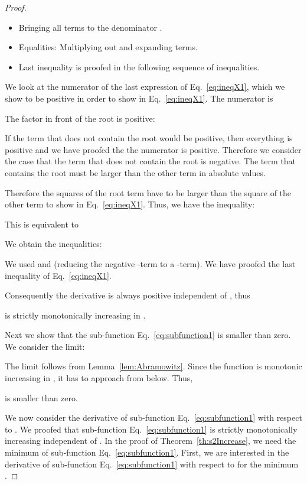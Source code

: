 \documentclass{article}
\begin{document}
\begin{proof}
\begin{itemize}
\item Bringing all terms to the denominator
.

\item Equalities: Multiplying out and expanding terms.

\item Last inequality  is proofed in the following sequence of
  inequalities.
\end{itemize}

We look at the numerator of the last expression of 
Eq.~\eqref{eq:ineqX1}, which we show to be
positive in order to show  in 
Eq.~\eqref{eq:ineqX1}. The numerator is 

The factor 
in front of the root is positive:

If the term that does not contain the root would be positive, 
then everything is positive and we have proofed the the numerator is
positive. Therefore we consider the case that the term that does
not contain the root is negative.
The term that contains the root must be larger than 
the other term in absolute values. 

Therefore the squares of the root term have to be larger 
than the square of the other term to show  in 
Eq.~\eqref{eq:ineqX1}.
Thus, we have the inequality:


This is equivalent to

We obtain the inequalities: 

We used  and  (reducing the negative -term to a
-term).
We have proofed the last inequality  of Eq.~\eqref{eq:ineqX1}.

Consequently the derivative is always positive independent of ,
thus 

is strictly monotonically increasing in .



Next we show that the 
sub-function Eq.~\eqref{eq:subfunction1} is smaller
than zero.
We consider the limit:

The limit follows from Lemma~\ref{lem:Abramowitz}.
Since the function is monotonic increasing in , it has to approach
 from below. Thus,

is smaller than zero.


We now consider the derivative of sub-function
Eq.~\eqref{eq:subfunction1} with respect to .
We proofed that sub-function
Eq.~\eqref{eq:subfunction1} is  strictly monotonically increasing 
independent of . 
In the proof of Theorem~\ref{th:s2Increase}, we need the minimum
of  sub-function
Eq.~\eqref{eq:subfunction1}. First, we are interested in the
derivative of sub-function
Eq.~\eqref{eq:subfunction1} with respect to 
for the minimum .


\end{proof}
\end{document}
